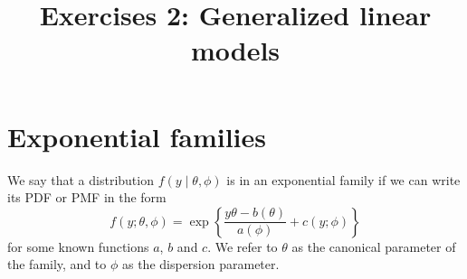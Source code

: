 \documentclass{mynotes}
\title[Lesson 1 $\cdot$ SDS 383D]{Exercises 2: Generalized linear models}
\date{}  %
\begin{document}
\maketitle%

\section{Exponential families}

We say that a distribution $f(y \mid \theta, \phi)$ is in an exponential family if we can write its PDF or PMF in the form
$$
f(y; \theta, \phi) = \exp \left\{ \frac{y \theta - b(\theta)}{a(\phi)} + c(y; \phi)   \right \}
$$
for some known functions $a$, $b$ and $c$.  We refer to $\theta$ as the canonical parameter of the family, and to $\phi$ as the dispersion parameter.  
\end{document}
